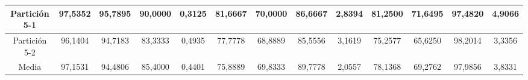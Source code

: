 \documentclass[12pt]{article}
\begin{document}
\begin{table}[H]
{\begin{tabular}{|c|cccc|cccc|cccc|}
Partición 5-1 & \multicolumn{1}{c|}{97,5352}                                                  & \multicolumn{1}{c|}{95,7895}                                                 & \multicolumn{1}{c|}{90,0000} & 0,3125 & \multicolumn{1}{c|}{81,6667}                                                  & \multicolumn{1}{c|}{70,0000}                                                 & \multicolumn{1}{c|}{86,6667} & 2,8394 & \multicolumn{1}{c|}{81,2500}                                                  & \multicolumn{1}{c|}{71,6495}                                                 & \multicolumn{1}{c|}{97,4820} & 4,9066 \\ \hline
Partición 5-2 & \multicolumn{1}{c|}{96,1404}                                                  & \multicolumn{1}{c|}{94,7183}                                                 & \multicolumn{1}{c|}{83,3333} & 0,4935 & \multicolumn{1}{c|}{77,7778}                                                  & \multicolumn{1}{c|}{68,8889}                                                 & \multicolumn{1}{c|}{85,5556} & 3,1619 & \multicolumn{1}{c|}{75,2577}                                                  & \multicolumn{1}{c|}{65,6250}                                                 & \multicolumn{1}{c|}{98,2014} & 3,3356 \\ \hline
Media         & \multicolumn{1}{c|}{97,1531}                                                  & \multicolumn{1}{c|}{94,4806}                                                 & \multicolumn{1}{c|}{85,4000} & 0,4401 & \multicolumn{1}{c|}{75,8889}                                                  & \multicolumn{1}{c|}{69,8333}                                                 & \multicolumn{1}{c|}{89,7778} & 2,0557 & \multicolumn{1}{c|}{78,1368}                                                  & \multicolumn{1}{c|}{69,2762}                                                 & \multicolumn{1}{c|}{97,9856} & 3,8331 \\ \hline
\end{tabular}}
\end{table}
\end{document}
